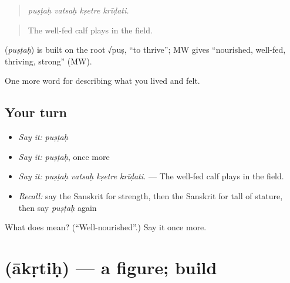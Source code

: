 \begin{quote}
   
\end{quote}

\begin{quote}
\emph{puṣṭaḥ vatsaḥ kṣetre krīḍati.}
\end{quote}

\begin{quote}
The well-fed calf plays in the field.
\end{quote}

\begin{cousinweb}
\textbf{} (\emph{puṣṭaḥ}) is built on the root √puṣ, \textquotedblleft{}to thrive\textquotedblright{}; MW gives \textquotedblleft{}nourished, well-fed, thriving, strong\textquotedblright{} (MW).
\end{cousinweb}

\begin{grammarlens}[title={What you've built}]
One more word for describing what you lived and felt.
\end{grammarlens}

\subsection*{Your turn}
\begin{itemize}
\raggedright
  \item \emph{Say it:} \emph{puṣṭaḥ}
  \item \emph{Say it:} \emph{puṣṭaḥ}, once more
  \item \emph{Say it:} \emph{puṣṭaḥ vatsaḥ kṣetre krīḍati.} — The well-fed calf plays in the field.
  \item \emph{Recall:} say the Sanskrit for strength, then the Sanskrit for tall of stature, then say \emph{puṣṭaḥ} again
\end{itemize}

\begin{tcolorbox}[breakable,colback=teal!4,colframe=teal!35!black,title={Before you move on}]
What does  mean? (\textquotedblleft{}Well-nourished\textquotedblright{}.) Say it once more.
\end{tcolorbox}
\section[\texorpdfstring{\sk{आकृतिः} (ākṛtiḥ)}{आकृतिः (ākṛtiḥ)}]{ (ākṛtiḥ) — a figure; build}

\label{lesson:SA-C476-akrtih}




